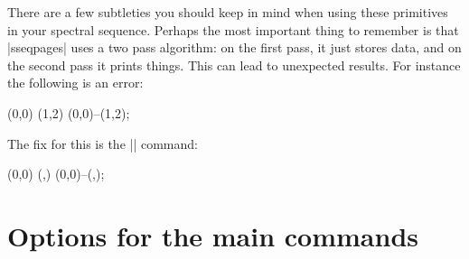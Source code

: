 \documentclass{ltxdoc}
\begin{document}
\begin{sseqdata}[name=ex1,degree={#1}{1-#1}]
There are a few subtleties you should keep in mind when using these \tikzname\space primitives in your spectral sequence. Perhaps the most important thing to remember is that |sseqpages| uses a two pass algorithm: on the first pass, it just stores data, and on the second pass it prints things. This can lead to unexpected results. For instance the following is an error:
\begin{codeexample}
\begin{sseqdata}[name=error example]
\class(0,0)
\def\x{1}\def\y{2}
\class(\x,\y) %
\draw (0,0)--(\x,\y); %
\end{sseqdata}
\printpage[name=error example] %
\end{codeexample}

The fix for this is the |\addtocontext| command:
\begin{codeexample}[]
\begin{sseqdata}[name=error example]
\class(0,0)
\class(\x,\y)
\draw (0,0)--(\x,\y);
\end{sseqdata}
\printpage[name=error example]
\end{codeexample}

\section{Options for the main commands}

\end{sseqdata}
\end{document}
